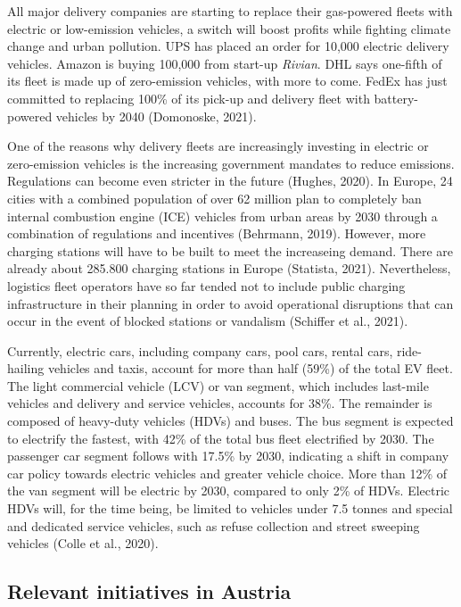 \documentclass[
]{book}
\begin{document}
All major delivery companies are starting to replace their gas-powered fleets with electric or low-emission vehicles, a switch will boost profits while fighting climate change and urban pollution. UPS has placed an order for 10,000 electric delivery vehicles. Amazon is buying 100,000 from start-up \emph{Rivian}. DHL says one-fifth of its fleet is made up of zero-emission vehicles, with more to come. FedEx has just committed to replacing 100\% of its pick-up and delivery fleet with battery-powered vehicles by 2040 (Domonoske, 2021).

One of the reasons why delivery fleets are increasingly investing in electric or zero-emission vehicles is the increasing government mandates to reduce emissions. Regulations can become even stricter in the future (Hughes, 2020). In Europe, 24 cities with a combined population of over 62 million plan to completely ban internal combustion engine (ICE) vehicles from urban areas by 2030 through a combination of regulations and incentives (Behrmann, 2019). However, more charging stations will have to be built to meet the increaseing demand. There are already about 285.800 charging stations in Europe (Statista, 2021). Nevertheless, logistics fleet operators have so far tended not to include public charging infrastructure in their planning in order to avoid operational disruptions that can occur in the event of blocked stations or vandalism (Schiffer et al., 2021).

Currently, electric cars, including company cars, pool cars, rental cars, ride-hailing vehicles and taxis, account for more than half (59\%) of the total EV fleet. The light commercial vehicle (LCV) or van segment, which includes last-mile vehicles and delivery and service vehicles, accounts for 38\%. The remainder is composed of heavy-duty vehicles (HDVs) and buses. The bus segment is expected to electrify the fastest, with 42\% of the total bus fleet electrified by 2030. The passenger car segment follows with 17.5\% by 2030, indicating a shift in company car policy towards electric vehicles and greater vehicle choice. More than 12\% of the van segment will be electric by 2030, compared to only 2\% of HDVs. Electric HDVs will, for the time being, be limited to vehicles under 7.5 tonnes and special and dedicated service vehicles, such as refuse collection and street sweeping vehicles (Colle et al., 2020).

\hypertarget{relevant-initiatives-in-austria-27}{%
\subsection*{Relevant initiatives in Austria}\label{relevant-initiatives-in-austria-27}}
\end{document}
